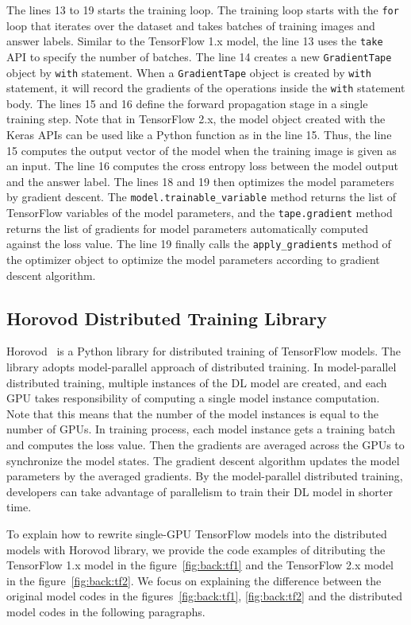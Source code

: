 The lines 13 to 19 starts the training loop.
The training loop starts with the {\tt for} loop that iterates over the dataset
and takes batches of training images and answer labels.
Similar to the TensorFlow 1.x model,
the line 13 uses the {\tt take} API to specify the number of batches.
The line 14 creates a new {\tt GradientTape} object by {\tt with} statement.
When a {\tt GradientTape} object is created by {\tt with} statement,
it will record the gradients of the operations inside the {\tt with}
statement body.
The lines 15 and 16 define the forward propagation stage in a single
training step.
Note that in TensorFlow 2.x, the model object created with the Keras APIs can be
used like a Python function as in the line 15.
Thus, the line 15 computes the output vector of the model when the
training image is given as an input.
The line 16 computes the cross entropy loss between the model output and
the answer label.
The lines 18 and 19 then optimizes the model parameters by gradient descent. 
The {\tt model.trainable\_variable} method returns the list of 
TensorFlow variables of the model parameters,
and the {\tt tape.gradient} method returns the list of
gradients for model parameters automatically computed against the
loss value.
The line 19 finally calls the {\tt apply\_gradients} method of the optimizer
object to optimize the model parameters according to gradient descent algorithm.


\subsection{Horovod Distributed Training Library}

Horovod~\cite{sergeev2018horovod} is a Python library for distributed training 
of TensorFlow models. The library adopts model-parallel approach of distributed 
training. 
In model-parallel distributed training, multiple instances of the DL model
are created, and each GPU takes responsibility of computing a single model
instance computation. %
Note that this means that the number of the model instances 
is equal to the number of GPUs.
In training process, each model instance gets a training batch and computes the
loss value. Then the gradients are averaged across the GPUs to synchronize the
model states. The gradient descent algorithm updates the model parameters by
the averaged gradients.
By the model-parallel distributed training, developers can take advantage of
parallelism to train their DL model in shorter time.

To explain how to rewrite single-GPU TensorFlow models into the distributed 
models with Horovod library, we provide the code examples of ditributing 
the TensorFlow 1.x model in the figure~\ref{fig:back:tf1} and the TensorFlow
2.x model in the figure~\ref{fig:back:tf2}.
We focus on explaining the difference between the original model codes in
the figures~\ref{fig:back:tf1}, \ref{fig:back:tf2} and the distributed 
model codes in the following paragraphs.

